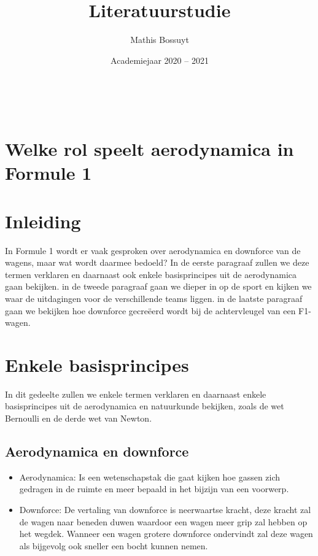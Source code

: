 \documentclass[a4paper,kulak]{kulakarticle} %
\date{Academiejaar 2020 -- 2021}
\title{Literatuurstudie}
\author{Mathis Bossuyt}
\begin{document}
\maketitle
\\
\section*{Welke rol speelt aerodynamica in Formule 1}
\section*{Inleiding}

In Formule 1 wordt er vaak gesproken over aerodynamica en downforce van de wagens, maar wat wordt daarmee bedoeld? In de eerste paragraaf zullen we deze termen verklaren en daarnaast ook enkele basisprincipes uit de aerodynamica gaan bekijken. in de tweede paragraaf gaan we dieper in op de sport en kijken we waar de uitdagingen voor de verschillende teams liggen. in de laatste paragraaf gaan we bekijken hoe downforce gecreëerd wordt bij de achtervleugel van een F1-wagen. 

\section{Enkele basisprincipes}

In dit gedeelte zullen we enkele termen verklaren en daarnaast enkele basisprincipes uit de aerodynamica en natuurkunde bekijken, zoals de wet Bernoulli en de derde wet van Newton.

\subsection{Aerodynamica en downforce}

\begin{itemize}
	
	\item Aerodynamica: Is een wetenschapstak die gaat kijken hoe gassen zich gedragen in de ruimte en meer bepaald in het bijzijn van een voorwerp.
	\cite{houghton2003aerodynamics}
	
	\item Downforce: De vertaling van downforce is neerwaartse kracht, deze kracht zal de wagen naar beneden duwen waardoor een wagen meer grip zal hebben op het wegdek. Wanneer een wagen grotere downforce ondervindt zal deze wagen als bijgevolg ook sneller een bocht kunnen nemen. 
	\cite{houghton2003aerodynamics}
	
\end{itemize}
\end{document}
